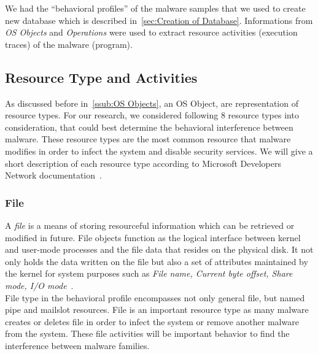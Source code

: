 We had the ``behavioral profiles'' of the malware samples that we used to create new database which is described in~\autoref{sec:Creation of Database}.
Informations from \emph{OS Objects} and \emph{Operations} were used to extract resource activities (execution traces) of the malware (program).

\subsection{Resource Type and Activities}
\label{sub:Resource Types and Activities}
As discussed before in~\autoref{ssub:OS Objects}, an OS Object, are representation of resource types.
For our research, we considered following 8 resource types into consideration, that could best determine the behavioral interference between malware.
These resource types are the most common resource that malware modifies in order to infect the system and disable security services.
We will give a short description of each resource type according to Microsoft Developers Network documentation~\cite[MSDN]{msdn}.
\subsubsection{File}
\label{ssub:File}
A \emph{file} is a means of storing resourceful information which can be retrieved or modified in future.
File objects function as the logical interface between kernel and user-mode processes and the file data that resides on the physical disk.
It not only holds the data written on the file but also a set of attributes maintained by the kernel for system purposes such as \emph{File name, Current byte offset, Share mode, I/O mode}~\cite[]{msfile}.\\
File type in the behavioral profile encompasses not only general file, but named pipe and mailslot resources.
File is an important resource type as many malware creates or deletes file in order to infect the system or remove another malware from the system.
These file activities will be important behavior to find the interference between malware families.
